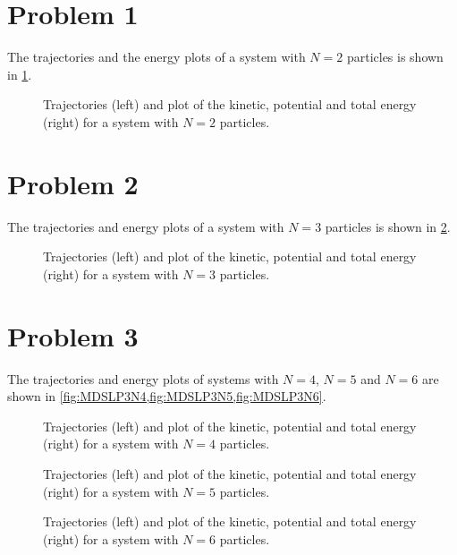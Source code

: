 \documentclass[titlepage]{report}
\begin{document}
\section{Problem 1}
The trajectories and the energy plots of a system with $ N = 2 $ particles is shown in \cref{fig:MDSLP1}.
\begin{figure}[h!]
	\centering
	
	\caption{Trajectories (left) and plot of the kinetic, potential and total energy (right) for a system with $ N = 2 $ particles.
		}
	\label{fig:MDSLP1}
\end{figure}

\section{Problem 2}
The trajectories and energy plots of a system with $ N = 3 $ particles is shown in \cref{fig:MDSLP2}.
\begin{figure}[h!]
	\centering
	
	\caption{Trajectories (left) and plot of the kinetic, potential and total energy (right) for a system with $ N = 3 $ particles.}
	\label{fig:MDSLP2}
\end{figure}

\section{Problem 3}
The trajectories and energy plots of systems with $ N = 4 $, $ N = 5 $ and $ N = 6 $ are shown in \cref{fig:MDSLP3N4,fig:MDSLP3N5,fig:MDSLP3N6}.

\begin{figure}[h!]
	\centering
	
	\caption{Trajectories (left) and plot of the kinetic, potential and total energy (right) for a system with $ N = 4 $ particles.}
	\label{fig:MDSLP3N4}
\end{figure}

\begin{figure}[h!]
	\centering
	
	\caption{Trajectories (left) and plot of the kinetic, potential and total energy (right) for a system with $ N = 5 $ particles.}
	\label{fig:MDSLP3N5}
\end{figure}

\begin{figure}[h!]
	\centering
	
	\caption{Trajectories (left) and plot of the kinetic, potential and total energy (right) for a system with $ N = 6 $ particles.}
	\label{fig:MDSLP3N6}
\end{figure}
\end{document}
